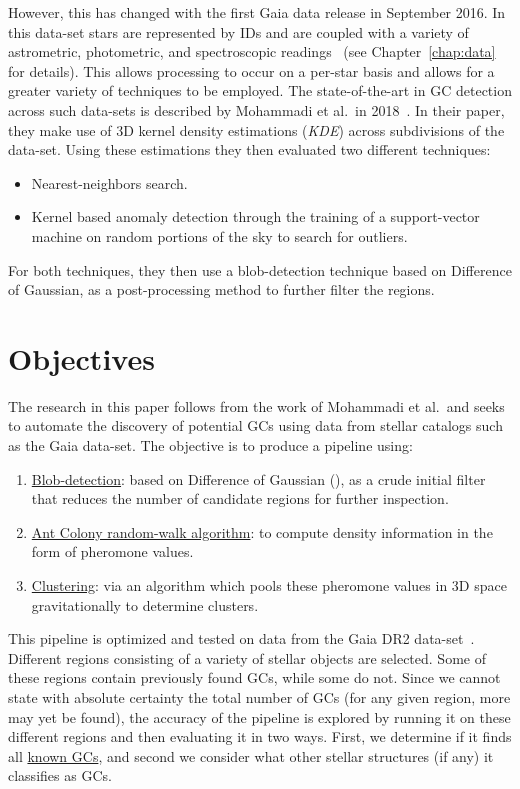 However, this has changed with the first Gaia data release in September 2016. In this data-set stars are represented by IDs and are coupled with a variety of astrometric, photometric, and spectroscopic readings~\cite{gaiaMission} (see Chapter~\ref{chap:data} for details). This allows processing to occur on a per-star basis and allows for a greater variety of techniques to be employed. The state-of-the-art in GC detection across such data-sets is described by Mohammadi et al.\ in 2018~\cite{Mohammadi}. In their paper, they make use of 3D kernel density estimations (\textit{KDE}) across subdivisions of the data-set. Using these estimations they then evaluated two different techniques:
\begin{itemize}
    \item Nearest-neighbors search.
    \item Kernel based anomaly detection through the training of a support-vector machine on random portions of the sky to search for outliers.
\end{itemize}
For both techniques, they then use a blob-detection technique based on Difference of Gaussian, as a post-processing method to further filter the regions.

\section{Objectives}

The research in this paper follows from the work of Mohammadi et al.\ and seeks to automate the discovery of potential GCs using data from stellar catalogs such as the Gaia data-set. The objective is to produce a pipeline using:
\begin{enumerate}
    \item \hyperref[sec:DoG]{Blob-detection}: based on Difference of Gaussian (\textit{\blobdog{}}), as a crude initial filter that reduces the number of candidate regions for further inspection.
    \item \hyperref[sec:Ant]{Ant Colony random-walk algorithm}: to compute density information in the form of pheromone values.
    \item \hyperref[sec:Clustering]{Clustering}: via an algorithm which pools these pheromone values in 3D space gravitationally to determine clusters.
\end{enumerate}

This pipeline is optimized and tested on data from the Gaia DR2 data-set~\cites{gaiaMission, gaiaDr2}. Different regions consisting of a variety of stellar objects are selected. Some of these regions contain previously found GCs, while some do not. Since we cannot state with absolute certainty the total number of GCs (for any given region, more may yet be found), the accuracy of the pipeline is explored by running it on these different regions and then evaluating it in two ways. First, we determine if it finds all \hyperref[tb:known-gcs]{known GCs}, and second we consider what other stellar structures (if any) it classifies as GCs.

